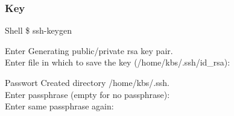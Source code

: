 \documentclass{beamer}
\begin{document}
    \begin{frame}
        \frametitle{Key}
        \begin{block}{Shell}
            \$ ssh-keygen
        \end{block}
        \pause
        \begin{block}{Enter}
            Generating public/private rsa key pair. \\
            Enter file in which to save the key (/home/kbs/.ssh/id\_rsa):
        \end{block}
        \pause
        \begin{block}{Passwort}
            Created directory /home/kbs/.ssh. \\
            Enter passphrase (empty for no passphrase):\\
            Enter same passphrase again: \\
        \end{block}
    \end{frame}
\end{document}
